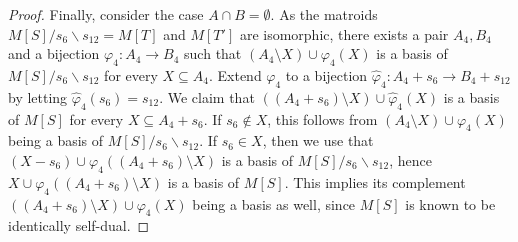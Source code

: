 \documentclass[11pt,a4paper]{article}
\theoremstyle{plain}
\theoremstyle{definition}
\begin{document}
\begin{proof}
Finally, consider the case $A \cap B = \emptyset$. As the matroids $M[S] / s_6 \backslash s_{12} = M[T]$ and $M[T']$ are isomorphic, there exists a pair $A_4, B_4$ and a bijection $\varphi_4 \colon A_4 \to B_4$ such that $(A_4 \setminus X) \cup \varphi_4(X)$ is a basis of $M[S]/s_6\backslash s_{12}$ for every $X \subseteq A_4$. Extend $\varphi_4$ to a bijection $\hat \varphi_4 \colon A_4 + s_6 \to B_4 + s_{12}$ by letting $\hat \varphi_4(s_6) = s_{12}$. We claim that $((A_4+s_6)\setminus X) \cup \hat\varphi_4(X)$ is a basis of $M[S]$ for every $X \subseteq A_4+s_6$. If $s_6 \not \in X$, this follows from $(A_4  \setminus X) \cup \varphi_4(X)$ being a basis of $M[S] / s_6 \backslash s_{12}$. If $s_6 \in X$, then we use that $(X-s_6) \cup \varphi_4((A_4+s_6) \setminus X)$ is a basis of $M[S]/s_6 \backslash s_{12}$, hence $X \cup \varphi_4((A_4 + s_6)\setminus X)$ is a basis of $M[S]$. This implies its complement $((A_4+s_6)\setminus X) \cup \varphi_4(X)$ being a basis as well, since $M[S]$ is known to be identically self-dual. 
\end{proof}
\end{document}
